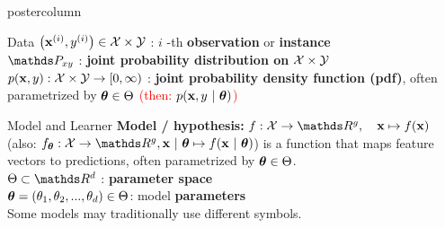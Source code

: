 \documentclass{beamer}
\begin{document}
\begin{frame}[fragile]{}
\begin{columns}
\begin{column}{.31\textwidth}
\begin{beamercolorbox}[center]{postercolumn}
\begin{minipage}{.98\textwidth}
{\begin{myblock}{Data}
$\left(\mathbf{x}^{(i)}, y^{(i)}\right) \in \mathcal{X}\times \mathcal{Y}$ : $i$ -th \textbf{observation} or \textbf{instance} \\
 
$\P_{xy}$ : \textbf{joint probability distribution on} $\mathcal{X} \times \mathcal{Y}$ \\
  
$p(\mathbf{x},y): \mathcal{X} \times \mathcal{Y} \rightarrow [0, \infty)$ : \textbf{joint probability density function (pdf)}, often parametrized by $\bm{\theta} \in \Theta$ \textcolor{red}{(then: $p(\mathbf{x}, y ~|~ \bm{\theta})$)} \\
\end{myblock}
					\begin{myblock}{Model and Learner}
            \textbf{Model / \textbf{hypothesis}: }$f : \Xspace \rightarrow \R^g, \quad \xv \mapsto \fx$ (also: $f_{\thetab} : \Xspace \rightarrow \R^g, \xv ~|~ \thetab \mapsto \fxt$) is a function that maps feature vectors to predictions, often parametrized by $\bm{\theta} \in \Theta$. \\
            
            
            
            $\Theta \subset \R^d$ : \textbf{parameter space} \\
              
            $\bm{\theta} = (\theta_1, \theta_2, ..., \theta_d) \in \Theta$: model \textbf{parameters}\\
              \hspace*{1ex}Some models may traditionally use different symbols. \\
      

\end{myblock}}
\end{minipage}
\end{beamercolorbox}
\end{column}
\end{columns}
\end{frame}
\end{document}
